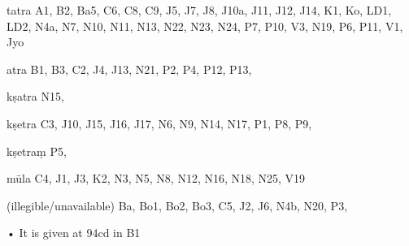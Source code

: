 \begin{marma}[hp03_060]


\item[tatra] A1, B2, Ba5, C6, C8, C9, J5, J7, J8, J10a, J11, J12, J14, K1, Ko, LD1, LD2, N4a, N7, N10, N11, N13, N22, N23, N24, P7, P10, V3, N19, P6, P11, V1, Jyo
\item[atra] B1, B3, C2, J4, J13, N21, P2, P4, P12, P13, 
\item[kṣatra] N15,
\item[kṣetra] C3, J10, J15, J16, J17, N6, N9, N14, N17, P1, P8, P9, 
\item[kṣetraṃ] P5,
\item[mūla] C4, J1, J3, K2, N3, N5, N8, N12, N16, N18, N25, V19  
  \item[(illegible/unavailable)] Ba, Bo1, Bo2, Bo3, C5, J2, J6, N4b, N20, P3,

  \begin{description}
    • It is given at 94cd in B1
    \end{description}

\end{marma}

